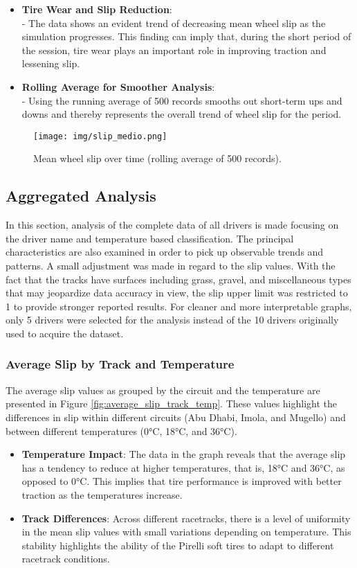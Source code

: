 \documentclass[a4paper,final,12pt]{report}
\begin{document}
\begin{itemize}
    \item \textbf{Tire Wear and Slip Reduction}:\\
    - The data shows an evident trend of decreasing mean wheel slip as the simulation progresses. This finding can imply that, during the short period of the session, tire wear plays an important role in improving traction and lessening slip.
    \item \textbf{Rolling Average for Smoother Analysis}:\\
    - Using the running average of 500 records smooths out short-term ups and downs and thereby represents the overall trend of wheel slip for the period.
\end{itemize}
\begin{figure}[H]
    \centering
    \texttt{[image: img/slip\_medio.png]}
    \caption{Mean wheel slip over time (rolling average of 500 records).}
    \label{fig:mean_wheel_slip}
\end{figure}


\subsection{Aggregated Analysis}
In this section, analysis of the complete data of all drivers is made focusing on the driver name and temperature based classification. The principal characteristics are also examined in order to pick up observable trends and patterns. A small adjustment was made in regard to the slip values. With the fact that the tracks have surfaces including grass, gravel, and miscellaneous types that may jeopardize data accuracy in view, the slip upper limit was restricted to 1 to provide stronger reported results.
For cleaner and more interpretable graphs, only 5 drivers were selected for the analysis instead of the 10 drivers originally used to acquire the dataset.

\subsubsection{Average Slip by Track and Temperature}
The average slip values as grouped by the circuit and the temperature are presented in Figure \ref{fig:average_slip_track_temp}. These values highlight the differences in slip within different circuits (Abu Dhabi, Imola, and Mugello) and between different temperatures (0°C, 18°C, and 36°C).

\begin{itemize}
    \item \textbf{Temperature Impact}: 
    The data in the graph reveals that the average slip has a tendency to reduce at higher temperatures, that is, 18°C and 36°C, as opposed to 0°C. This implies that tire performance is improved with better traction as the temperatures increase.
    \item \textbf{Track Differences}: 
    Across different racetracks, there is a level of uniformity in the mean slip values with small variations depending on temperature. This stability highlights the ability of the Pirelli soft tires to adapt to different racetrack conditions.
\end{itemize}
\end{document}
